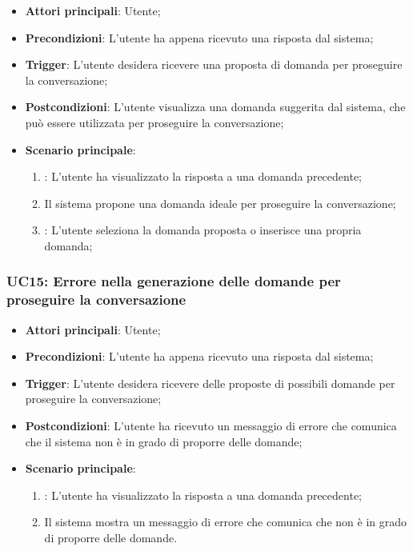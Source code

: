 \begin{itemize}
    \item \textbf{Attori principali}: Utente;
    \item \textbf{Precondizioni}: L'utente ha appena ricevuto una risposta dal sistema;
    \item \textbf{Trigger}: L'utente desidera ricevere una proposta di domanda per proseguire la conversazione;
    \item \textbf{Postcondizioni}: L'utente visualizza una domanda suggerita dal sistema, che può essere utilizzata per proseguire la conversazione;
    \item \textbf{Scenario principale}:
    \begin{enumerate}
        \item {}: L'utente ha visualizzato la risposta a una domanda precedente;
        \item Il sistema propone una domanda ideale per proseguire la conversazione;
        \item {}: L'utente seleziona la domanda proposta o inserisce una propria domanda;
    \end{enumerate}
\end{itemize}

\hypertarget{UC15}{}
\subsubsection{UC15: Errore nella generazione delle domande per proseguire la conversazione}
\begin{itemize}
    \item \textbf{Attori principali}: Utente;
    \item \textbf{Precondizioni}: L'utente ha appena ricevuto una risposta dal sistema;
    \item \textbf{Trigger}: L'utente desidera ricevere delle proposte di possibili domande per proseguire la conversazione;
    \item \textbf{Postcondizioni}: L'utente ha ricevuto un messaggio di errore che comunica che il sistema non è in grado di proporre delle domande;
    \item \textbf{Scenario principale}:
    \begin{enumerate}
        \item {}: L'utente ha visualizzato la risposta a una domanda precedente;
        \item Il sistema mostra un messaggio di errore che comunica che non è in grado di proporre delle domande.
    \end{enumerate}
\end{itemize}